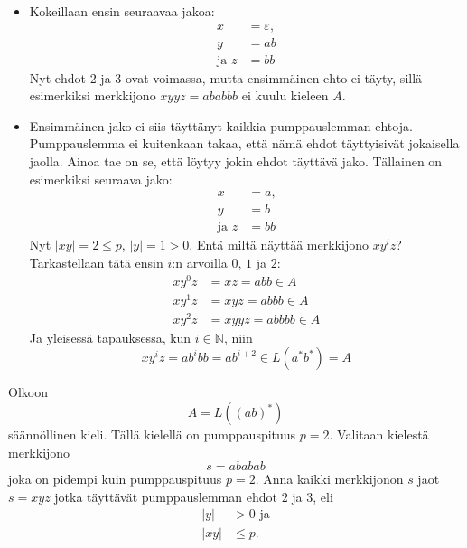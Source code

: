 \documentclass[a4paper,11pt]{article}
\theoremstyle{definition}
\newcommand{\Nat}{\mathbb{N}}
\begin{document}
\begin{itemize}
    \item Kokeillaan ensin seuraavaa jakoa:
        \begin{align*}
            x            & = \varepsilon \text{,}  \\
            y            & = ab            \\
            \text{ja } z & = bb
        \end{align*}
        Nyt ehdot 2 ja 3 ovat voimassa, mutta ensimmäinen ehto ei täyty, sillä
        esimerkiksi merkkijono $xyyz = ababbb$ ei kuulu kieleen $A$.

    \item Ensimmäinen jako ei siis täyttänyt kaikkia pumppauslemman ehtoja.
        Pumppauslemma ei kuitenkaan takaa, että nämä ehdot täyttyisivät
        jokaisella jaolla. Ainoa tae on se, että löytyy jokin ehdot täyttävä
        jako. Tällainen on esimerkiksi seuraava jako:
        \begin{align*}
            x              & = a \textrm{,} \\
            y              & = b \\
            \textrm{ja } z & = bb
        \end{align*}
        Nyt $|xy| = 2 \leq p$, $|y| = 1 > 0$. Entä miltä näyttää merkkijono
        $xy^iz$? Tarkastellaan tätä ensin $i$:n arvoilla $0$, $1$ ja $2$:
        \begin{align*}
            xy^0z & = xz  = abb \in A \\
            xy^1z & = xyz = abbb \in A \\
            xy^2z & = xyyz = abbbb \in A
        \end{align*}
        Ja yleisessä tapauksessa, kun $i \in \Nat$, niin
        \begin{equation*}
            xy^iz = ab^ibb = ab^{i+2} \in L(a^*b^*) = A
        \end{equation*}
\end{itemize}

\begin{exercise}
    Olkoon
    \begin{equation*}
        A = L((ab)^*)
    \end{equation*}
    säännöllinen kieli. Tällä kielellä on pumppauspituus $p = 2$. Valitaan
    kielestä merkkijono
    \begin{equation*}
        s = ababab
    \end{equation*}
    joka on pidempi kuin pumppauspituus $p = 2$.  Anna kaikki merkkijonon $s$
    jaot $s = xyz$ jotka täyttävät pumppauslemman ehdot $2$ ja $3$, eli
    \begin{align*}
        |y|  & > 0 \textrm{ ja} \\
        |xy| & \leq p \text{.}
    \end{align*}
\end{exercise}
\end{document}
